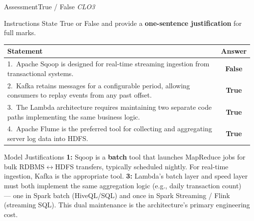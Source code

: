 \documentclass[aspectratio=169,10pt]{beamer}
\begin{document}
\begin{frame}{Assessment\textemdash True / False \hfill\small\textit{CLO3}}
  \begin{block}{Instructions}
    State True or False and provide a \textbf{one-sentence justification} for full marks.
  \end{block}
  \vspace{4pt}
  \centering
  \renewcommand{\arraystretch}{1.6}
  \begin{tabular}{p{9.0cm}c}
    \toprule
    \textbf{Statement} & \textbf{Answer} \\
    \midrule
    1.\ Apache Sqoop is designed for real-time streaming ingestion from transactional systems. &
    \alert{\textbf{False}} \\
    2.\ Kafka retains messages for a configurable period, allowing consumers to replay events from any past offset. &
    \textbf{True} \\
    3.\ The Lambda architecture requires maintaining two separate code paths implementing the same business logic. &
    \textbf{True} \\
    4.\ Apache Flume is the preferred tool for collecting and aggregating server log data into HDFS. &
    \textbf{True} \\
    \bottomrule
  \end{tabular}
  \vspace{6pt}
  \begin{exampleblock}{Model Justifications}
    \small \textbf{1:} Sqoop is a \textbf{batch} tool that launches MapReduce jobs for bulk RDBMS$\leftrightarrow$HDFS transfers, typically scheduled nightly.  For real-time ingestion, Kafka is the appropriate tool.  \textbf{3:} Lambda's batch layer and speed layer must both implement the same aggregation logic (e.g., daily transaction count) --- one in Spark batch (HiveQL/SQL) and once in Spark Streaming / Flink (streaming SQL).  This dual maintenance is the architecture's primary engineering cost.
  \end{exampleblock}
\end{frame}
\end{document}

